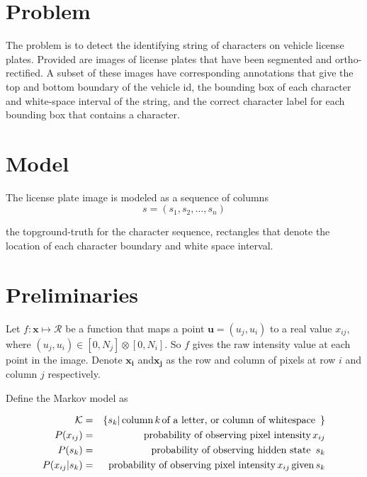 \documentclass[a4paper,12pt]{article}
\newcounter{ohNoteCounter}
\newcommand{\ohnote}[1]{{\scriptsize  \color{Cgreen} $\clubsuit$~\refstepcounter{ohNoteCounter}\textsf{[OH]$_{\arabic{ohNoteCounter}}$:{#1}}}}
\newcounter{jpNoteCounter}
\newcommand{\jpnote}[1]{{\scriptsize  \color{Cblue} $\blacksquare$ \refstepcounter{jpNoteCounter}\textsf{[JP]$_{\arabic{jpNoteCounter}}$:{#1}}}}
\renewcommand{\jpnote}[1]{}
\renewcommand{\ohnote}[1]{}
\begin{document}
\pagestyle{empty} \ohnote{This is useful way to leave notes. Both of
  us have command tu leave notes. I have \textbackslash ohnote, you
  have \textbackslash jpnote. Notes in whole document can be disabled
  by creating file with name ``.notes\_disabled''. }

\jpnote{Your notes will look like this }

\section{Problem}
The problem is to detect the identifying string of characters on
vehicle license plates.  Provided are images of license plates that
have been segmented and ortho-rectified. A subset of these images have
corresponding annotations that give the top and bottom boundary of the
vehicle id, the bounding box of each character and white-space
interval of the string, and the correct character label for each
bounding box that contains a character.

\section{Model}
The license plate image is modeled as a sequence of columns
\[
s = (s_1,s_2,\ldots,s_n)
\]


the topground-truth for the character sequence, rectangles that denote
the location of each character boundary and white space interval.

  \section{Preliminaries}
  Let $f : \mathbf{x} \mapsto \mathcal{R}$ be a function that maps a
  point $\mathbf{u} = (u_j,u_i)$ to a real value $x_{ij}$, where
  $(u_j,u_i) \in [0,N_j] \otimes [0,N_i]$.  So $f$ gives the raw
  intensity value at each point in the image.  Denote $\mathbf{x_i}$
  and$\mathbf{x_j}$ as the row and column of pixels at row $i$ and
  column $j$ respectively.

  Define the Markov model as

  \begin{eqnarray*}
    \mathcal{K} &=& \{ s_k | \text{\,column\,} k \text{\,of a letter, or column of whitespace \,} \} \\
    P(x_{ij}) &=& \text{probability of observing pixel intensity\,} x_{ij} \\
    P(s_k) &=& \text{probability of observing hidden state \,} s_{k} \\
    P(x_{ij}|s_k) &=& \text{probability of observing pixel intensity\,} x_{ij} \text{\,given\,} s_k  
  \end{eqnarray*}
\end{document}
